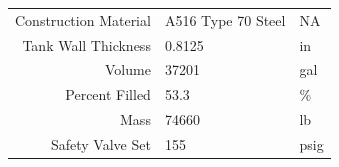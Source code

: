 \documentclass[10pt,parskip=half,
toc=sectionentrywithdots,
bibliography=totocnumbered,
captions=tableheading,numbers=noendperiod]{scrartcl}
\begin{document}
\begin{longtable}[]{@{}rll@{}}
\begin{minipage}[t]{0.23\columnwidth}\raggedleft
Construction Material\strut
\end{minipage} & \begin{minipage}[t]{0.23\columnwidth}\raggedright
A516 Type 70 Steel\strut
\end{minipage} & \begin{minipage}[t]{0.23\columnwidth}\raggedright
NA\strut
\end{minipage}\tabularnewline
\begin{minipage}[t]{0.23\columnwidth}\raggedleft
Tank Wall Thickness\strut
\end{minipage} & \begin{minipage}[t]{0.23\columnwidth}\raggedright
0.8125\strut
\end{minipage} & \begin{minipage}[t]{0.23\columnwidth}\raggedright
in\strut
\end{minipage}\tabularnewline
\begin{minipage}[t]{0.23\columnwidth}\raggedleft
Volume\strut
\end{minipage} & \begin{minipage}[t]{0.23\columnwidth}\raggedright
37201\strut
\end{minipage} & \begin{minipage}[t]{0.23\columnwidth}\raggedright
gal\strut
\end{minipage}\tabularnewline
\begin{minipage}[t]{0.23\columnwidth}\raggedleft
Percent Filled\strut
\end{minipage} & \begin{minipage}[t]{0.23\columnwidth}\raggedright
53.3\strut
\end{minipage} & \begin{minipage}[t]{0.23\columnwidth}\raggedright
\%\strut
\end{minipage}\tabularnewline
\begin{minipage}[t]{0.23\columnwidth}\raggedleft
Mass\strut
\end{minipage} & \begin{minipage}[t]{0.23\columnwidth}\raggedright
74660\strut
\end{minipage} & \begin{minipage}[t]{0.23\columnwidth}\raggedright
lb\strut
\end{minipage}\tabularnewline
\begin{minipage}[t]{0.23\columnwidth}\raggedleft
Safety Valve Set\strut
\end{minipage} & \begin{minipage}[t]{0.23\columnwidth}\raggedright
155\strut
\end{minipage} & \begin{minipage}[t]{0.23\columnwidth}\raggedright
psig\strut
\end{minipage}\tabularnewline
\bottomrule
\end{longtable}
\end{document}
